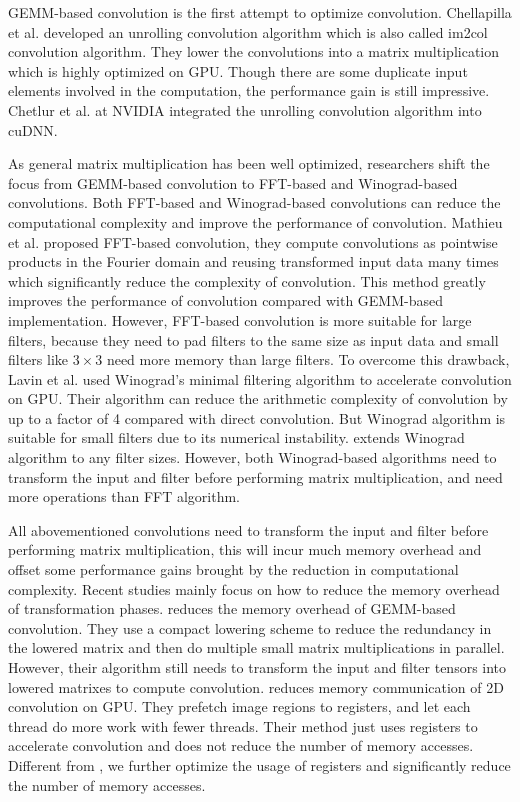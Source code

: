 \documentclass[sigplan,review,anonymous]{acmart}\settopmatter{printfolios=true,printccs=false,printacmref=false}
\begin{document}
GEMM-based convolution is the first attempt to optimize convolution. Chellapilla et al. \cite{Chellapilla2006High} developed an unrolling convolution algorithm which is also called im2col convolution algorithm. They lower the convolutions into a matrix multiplication which is highly optimized on GPU. Though there are some duplicate input elements involved in the computation, the performance gain is still impressive. Chetlur et al. \cite{ChetlurWVCTCS14} at NVIDIA integrated the unrolling convolution algorithm into cuDNN.

As general matrix multiplication has been well optimized, researchers shift the focus from GEMM-based convolution to FFT-based and Winograd-based convolutions. Both FFT-based and Winograd-based convolutions can reduce the computational complexity and improve the performance of convolution. Mathieu et al. \cite{mathieu2013fast} proposed FFT-based convolution, they compute convolutions as pointwise products in the Fourier domain and reusing transformed input data many times which significantly reduce the complexity of convolution. This method greatly improves the performance of convolution compared with GEMM-based implementation. However, FFT-based convolution is more suitable for large filters, because they need to pad filters to the same size as input data and small filters like $3 \times 3$ need more memory than large filters. To overcome this drawback, Lavin et al. \cite{lavin2016fast} used Winograd’s minimal filtering algorithm to accelerate convolution on GPU. Their algorithm can reduce the arithmetic complexity of convolution by up to a factor of 4 compared with direct convolution. But Winograd algorithm is suitable for small filters due to its numerical instability. \cite{Zhen2018Optimizing} extends Winograd algorithm to any filter sizes. However, both Winograd-based algorithms need to transform the input and filter before performing matrix multiplication, and need more operations than FFT algorithm. 

All abovementioned convolutions need to transform the input and filter before performing matrix multiplication, this will incur much memory overhead and offset some performance gains brought by the reduction in computational complexity. Recent studies mainly focus on how to reduce the memory overhead of transformation phases. \cite{cho2017mec} reduces the memory overhead of GEMM-based convolution. They use a compact lowering scheme to reduce the redundancy in the lowered matrix and then do multiple small matrix multiplications in parallel. However, their algorithm still needs to transform the input and filter tensors into lowered matrixes to compute convolution. \cite{Iandola2014Communication} reduces memory  communication of 2D convolution on GPU. They prefetch image regions to registers, and let each  thread do more work with fewer threads. Their method just uses registers to accelerate convolution and does not reduce the number of memory accesses. Different from \cite{Iandola2014Communication}, we further optimize the usage of registers and significantly reduce the number of memory accesses.
\end{document}
